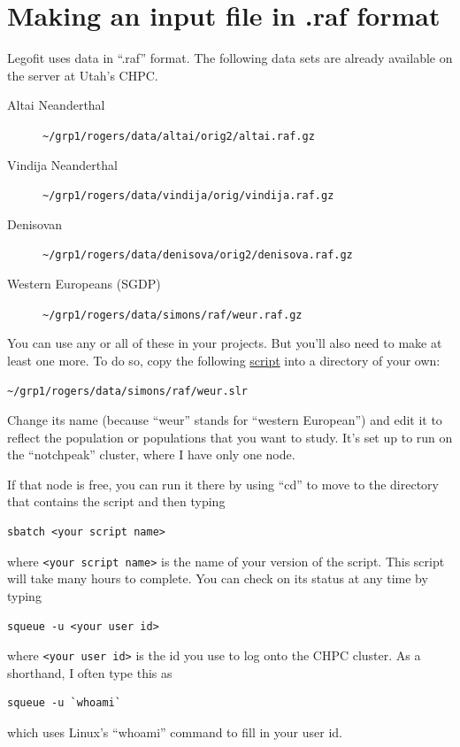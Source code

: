 \documentclass[11pt]{article}
\begin{document}
\section{Making an input file in .raf format}
\label{sec.raf}
Legofit uses data in ``.raf'' format. The following data sets are
already available on the server at Utah's CHPC.
\begin{description}
\item[Altai Neanderthal]
\verb|~/grp1/rogers/data/altai/orig2/altai.raf.gz|

\item[Vindija Neanderthal]
\verb|~/grp1/rogers/data/vindija/orig/vindija.raf.gz|

\item[Denisovan]
\verb|~/grp1/rogers/data/denisova/orig2/denisova.raf.gz|

\item[Western Europeans (SGDP)]
\verb|~/grp1/rogers/data/simons/raf/weur.raf.gz|
\end{description}
You can use any or all of these in your projects. But you'll also need
to make at least one more. To do so, copy the following
\href{https://alanrogers.github.io/agar22/legofit/weur.slr.html}{script}
into a directory of your own:
\begin{verbatim}
~/grp1/rogers/data/simons/raf/weur.slr
\end{verbatim}
Change its name (because ``weur'' stands for ``western European'') and
edit it to reflect the population or populations that you want to
study. It's set up to run on the ``notchpeak'' cluster, where I have
only one node.

If that node is free, you can run it there by using ``cd'' to move to
the directory that contains the script and then typing
\begin{verbatim}
sbatch <your script name>
\end{verbatim}
where \verb|<your script name>| is the name of your version of the
script. This script will take many hours to complete. You can check on
its status at any time by typing
\begin{verbatim}
squeue -u <your user id>
\end{verbatim}
where \verb|<your user id>| is the id you use to log onto the CHPC cluster.
As a shorthand, I often type this as
\begin{verbatim}
squeue -u `whoami`
\end{verbatim}
which uses Linux's ``whoami'' command to fill in your user id.
\end{document}
